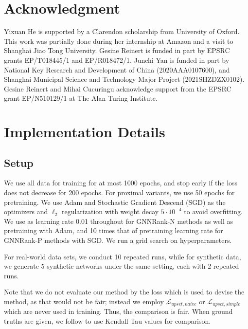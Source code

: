 \documentclass[nohyperref]{article}
\theoremstyle{plain}
\theoremstyle{definition}
\theoremstyle{remark}
\begin{document}
\section*{Acknowledgment} 
Yixuan He is supported by a Clarendon scholarship from University of Oxford. This work was partially done during her internship at Amazon and a visit to Shanghai Jiao Tong University.
Gesine Reinert is funded in part by EPSRC grants EP/T018445/1 and EP/R018472/1. Junchi Yan is funded in part by National Key Research and Development of China (2020AAA0107600), and Shanghai Municipal Science and Technology Major Project (2021SHZDZX0102). Gesine Reinert and Mihai Cucuringu acknowledge support from the EPSRC grant EP/N510129/1 at The Alan Turing Institute.





\newpage
\appendix
\section{Implementation Details}
\label{appendix_sec:implementation}
\subsection{Setup}
We use all data for training for at most 1000 epochs, and stop  early if the loss does not decrease for 200 epochs. For proximal variants, we use 50 epochs for pretraining. We use Adam \citep{kingma2014adam} and  Stochastic Gradient Descend (SGD) as the optimizers and $\ell_2$ regularization with weight decay $5\cdot 10^{-4}$ to avoid overfitting. We use as learning rate 0.01 throughout for GNNRank-N methods as well as pretraining with Adam, and 10 times that of pretraining learning rate for GNNRank-P methods with SGD. We run a grid search on hyperparameters. 

For real-world data sets, we conduct 10 repeated runs, while for synthetic data, we generate 5 synthetic networks under the same setting, each with 2 repeated runs.

Note that we do not evaluate our method by the loss which is used to devise the method, as that would not be fair; instead we employ  $\mathcal{L}_{upset, naive}$ or $\mathcal{L}_{upset, simple}$ which are never used in training. Thus, the comparison is fair. When ground truths are given, we follow \cite{d2021ranking} to use Kendall Tau values for comparison.
\end{document}

